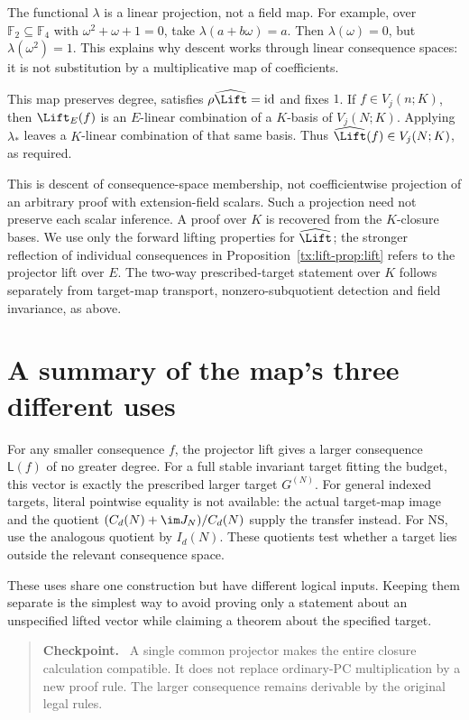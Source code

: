 \documentclass[11pt,a4paper,oneside,openany]{book}
\theoremstyle{definition}\newtheorem{definition}[theorem]{Definition}
\theoremstyle{remark}\newtheorem{remark}[theorem]{Remark}
\newenvironment{checkpoint}{\begin{quote}\small\textbf{Checkpoint.}\ }{\end{quote}}
\numberwithin{equation}{chapter}
\begin{document}
The functional $\lambda$ is a linear projection, not a field map.
For example, over $\mathbb F_2\subseteq\mathbb F_4$ with
$\omega^2+\omega+1=0$, take $\lambda(a+b\omega)=a$.
Then $\lambda(\omega)=0$, but $\lambda(\omega^2)=1$.
This explains why descent works through linear consequence spaces:
it is not substitution by a multiplicative map of coefficients.

This map preserves degree, satisfies $\rho\widehat\Lift=\mathrm{id}$
and fixes $1$. If $f\in V_j(n;K)$, then $\Lift_E(f)$ is an
$E$-linear combination of a $K$-basis of $V_j(N;K)$. Applying
$\lambda_*$ leaves a $K$-linear combination of that same basis.
Thus $\widehat\Lift(f)\in V_j(N;K)$, as required.

This is descent of consequence-space membership, not coefficientwise
projection of an arbitrary proof with extension-field scalars. Such a
projection need not preserve each scalar inference. A proof over $K$
is recovered from the $K$-closure bases. We use only the forward lifting
properties for $\widehat\Lift$; the stronger reflection of individual
consequences in Proposition~\ref{tx:lift-prop:lift} refers to the projector lift
over $E$. The two-way prescribed-target statement over $K$ follows separately
from target-map transport, nonzero-subquotient detection and field
invariance, as above.


\section{A summary of the map's three different uses}
For any smaller consequence $f$, the projector lift gives a larger
consequence $\mathsf L(f)$ of no greater degree. For a full stable
invariant target fitting the budget, this vector is exactly the
prescribed larger target $G^{(N)}$. For general indexed targets, literal
pointwise equality is not available: the actual target-map image and
the quotient $(C_d(N)+\im J_N)/C_d(N)$ supply the transfer instead.
For NS, use the analogous quotient by $I_d(N)$. These quotients test
whether a target lies outside the relevant consequence space.

These uses share one construction but have different logical inputs.
Keeping them separate is the simplest way to avoid proving only a
statement about an unspecified lifted vector while claiming a theorem
about the specified target.

\begin{checkpoint}
A single common projector makes the entire closure calculation compatible.
It does not replace ordinary-PC multiplication by a new proof rule.
The larger consequence remains derivable by the original legal rules.
\end{checkpoint}
\end{document}
